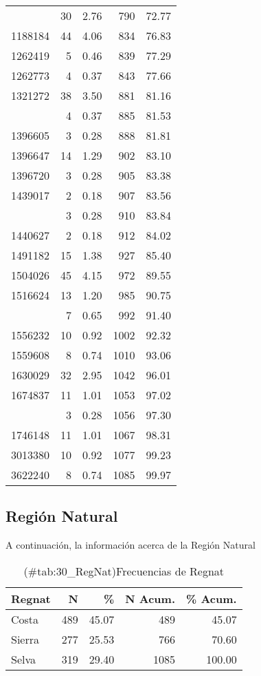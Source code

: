 \documentclass[
]{article}
\begin{document}
\begin{table}
\begin{tabular}[t]{lrrrr}
\addlinespace
1152537 & 30 & 2.76 & 790 & 72.77\\
1188184 & 44 & 4.06 & 834 & 76.83\\
1262419 & 5 & 0.46 & 839 & 77.29\\
1262773 & 4 & 0.37 & 843 & 77.66\\
1321272 & 38 & 3.50 & 881 & 81.16\\
\addlinespace
1348036 & 4 & 0.37 & 885 & 81.53\\
1396605 & 3 & 0.28 & 888 & 81.81\\
1396647 & 14 & 1.29 & 902 & 83.10\\
1396720 & 3 & 0.28 & 905 & 83.38\\
1439017 & 2 & 0.18 & 907 & 83.56\\
\addlinespace
1440577 & 3 & 0.28 & 910 & 83.84\\
1440627 & 2 & 0.18 & 912 & 84.02\\
1491182 & 15 & 1.38 & 927 & 85.40\\
1504026 & 45 & 4.15 & 972 & 89.55\\
1516624 & 13 & 1.20 & 985 & 90.75\\
\addlinespace
1548437 & 7 & 0.65 & 992 & 91.40\\
1556232 & 10 & 0.92 & 1002 & 92.32\\
1559608 & 8 & 0.74 & 1010 & 93.06\\
1630029 & 32 & 2.95 & 1042 & 96.01\\
1674837 & 11 & 1.01 & 1053 & 97.02\\
\addlinespace
1714815 & 3 & 0.28 & 1056 & 97.30\\
1746148 & 11 & 1.01 & 1067 & 98.31\\
3013380 & 10 & 0.92 & 1077 & 99.23\\
3622240 & 8 & 0.74 & 1085 & 99.97\\
\bottomrule
\end{tabular}
\end{table}

\subsection{Región Natural}\label{regiuxf3n-natural}

A continuación, la información acerca de la Región Natural

\begin{table}

\caption{(\#tab:30_RegNat)Frecuencias de Regnat}
\centering
\begin{tabular}[t]{lrrrr}
\toprule
Regnat & N & \% & N Acum. & \% Acum.\\
\midrule
Costa & 489 & 45.07 & 489 & 45.07\\
Sierra & 277 & 25.53 & 766 & 70.60\\
Selva & 319 & 29.40 & 1085 & 100.00\\
\bottomrule
\end{tabular}
\end{table}
\end{document}
